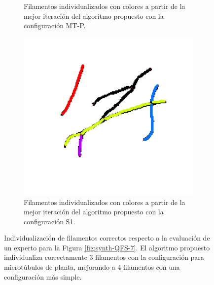 \begin{figure}[h!]
\begin{subfigure}[t]{0.47\textwidth}
        \caption{Filamentos individualizados con colores a partir de la mejor iteraci\'on del algoritmo propuesto con la configuraci\'on MT-P.}
        \label{fig:SynthQFS7-Individualizacion-BestP1}
    \end{subfigure}
    \hspace{0.2cm}
    \begin{subfigure}[t]{0.47\textwidth}
        \centering
        \includegraphics[scale=0.13]{resultImages/Synth-QuantitativeIFS-Fig7-phil-s1271-v056-exactMatch-antLabeled.png}
        \caption{Filamentos individualizados con colores a partir de la mejor iteraci\'on del algoritmo propuesto con la configuraci\'on S1.}
        \label{fig:SynthQFS7-Individualizacion-BestP2}
    \end{subfigure}
        
    \caption[Individualizaci\'on de filamentos correctos respecto a la evaluaci\'on de un experto para la Figura \ref{fig:synth-QFS-7}.]{Individualizaci\'on de filamentos correctos respecto a la evaluaci\'on de un experto para la Figura \ref{fig:synth-QFS-7}. El algoritmo propuesto individualiza correctamente 3 filamentos con la configuraci\'on para microt\'ubulos de planta, mejorando a 4 filamentos con una configuraci\'on m\'as simple.}
    \label{fig:Synth-QIFS-Result}
\end{figure}




